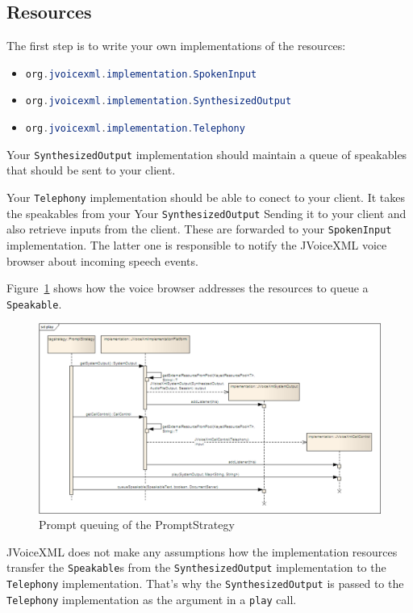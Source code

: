 \documentclass[11pt,a4paper]{article}
\begin{document}
\subsection{Resources}

The first step is to write your own implementations of the resources:
\begin{itemize}
  \item \lstinline[language=Java]{org.jvoicexml.implementation.SpokenInput}
  \item
  \lstinline[language=Java]{org.jvoicexml.implementation.SynthesizedOutput}
  \item \lstinline[language=Java]{org.jvoicexml.implementation.Telephony}
\end{itemize}

Your \lstinline[language=Java]{SynthesizedOutput} implementation should maintain
a queue of speakables that should be sent to your client.

Your \lstinline[language=Java]{Telephony} implementation should be able to
conect to your client. It takes the speakables from your Your
\lstinline[language=Java]{SynthesizedOutput} Sending it to your client and also
retrieve inputs from the client. These are forwarded to your 
\lstinline[language=Java]{SpokenInput} implementation. The latter one is
responsible to notify the JVoiceXML voice browser about incoming speech events.

Figure~\ref{fig:play} shows how the voice browser addresses the resources to
queue a \lstinline[language=Java]{Speakable}.
\begin{figure}[htp]
\begin{center}
  \includegraphics[width=\linewidth]{sd-play}
  \caption{Prompt queuing of the PromptStrategy}
  \label{fig:play}
\end{center}
\end{figure}
JVoiceXML does not make any assumptions how the implementation resources
transfer the \lstinline[language=Java]{Speakable}s from the
\lstinline[language=Java]{SynthesizedOutput} implementation to the
\lstinline[language=Java]{Telephony} implementation. That's why the
\lstinline[language=Java]{SynthesizedOutput} is passed to the
\lstinline[language=Java]{Telephony} implementation as the argument in a
\lstinline[language=Java]{play} call.
\end{document}
